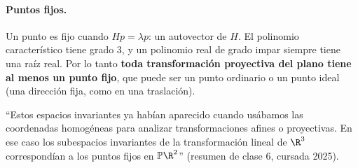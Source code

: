 \paragraph{Puntos fijos.}
Un punto es fijo cuando \(Hp=\lambda p\): un autovector de \(H\). El polinomio característico
tiene grado \(3\), y un polinomio real de grado impar siempre tiene una raíz real. Por lo tanto
\textbf{toda transformación proyectiva del plano tiene al menos un punto fijo}, que puede ser
un punto ordinario o un punto ideal (una dirección fija, como en una traslación).

\begin{idea}
``Estos espacios invariantes ya habían aparecido cuando usábamos las coordenadas
homogéneas para analizar transformaciones afines o proyectivas. En ese caso los subespacios
invariantes de la transformación lineal de \(\R^3\) correspondían a los puntos fijos en
\(\mathbb{P}\R^2\)'' (resumen de clase 6, cursada 2025).
\end{idea}

